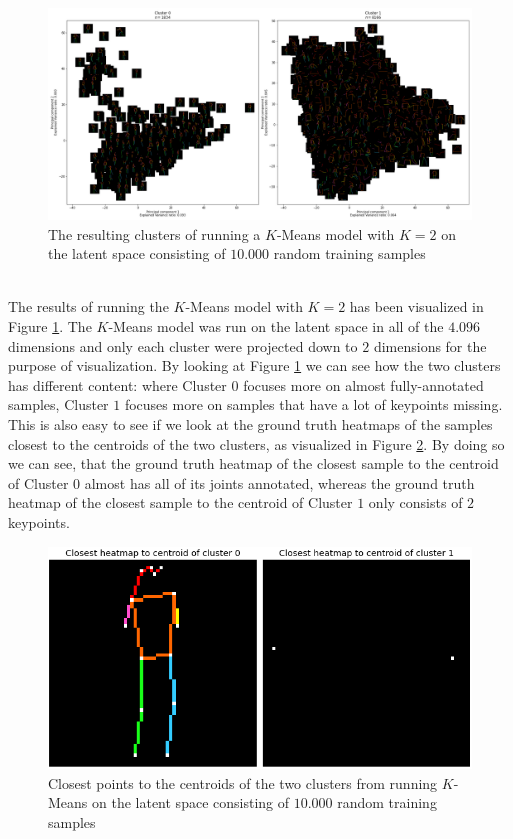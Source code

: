 \documentclass[./main.tex]{subfiles}
\begin{document}
\begin{figure}[htbp]
    \centering
    \includegraphics[width = \textwidth]{entities/cluster_all_skeletons.png}
    \caption{The resulting clusters of running a $K$-Means model with $K = 2$ on the latent space consisting of $10.000$ random training samples}
    \label{fig:clusters_all_skeletons}
\end{figure}
\\
The results of running the $K$-Means model with $K = 2$ has been visualized in Figure \ref{fig:clusters_all_skeletons}. The $K$-Means model was run on the latent space in all of the $4.096$ dimensions and only each cluster were projected down to $2$ dimensions for the purpose of visualization. By looking at Figure \ref{fig:clusters_all_skeletons} we can see how the two clusters has different content: where Cluster $0$ focuses more on almost fully-annotated samples, Cluster $1$ focuses more on samples that have a lot of keypoints missing. This is also easy to see if we look at the ground truth heatmaps of the samples closest to the centroids of the two clusters, as visualized in Figure \ref{fig:centroids_all}. By doing so we can see, that the ground truth heatmap of the closest sample to the centroid of Cluster $0$ almost has all of its joints annotated, whereas the ground truth heatmap of the closest sample to the centroid of Cluster $1$ only consists of $2$ keypoints.
\\
\begin{figure}[htbp]
    \centering
    \includegraphics[height = 4 cm]{entities/centroids_all_skeletons.png}
    \caption{Closest points to the centroids of the two clusters from running $K$-Means on the latent space consisting of $10.000$ random training samples}
    \label{fig:centroids_all}
\end{figure}
\end{document}
